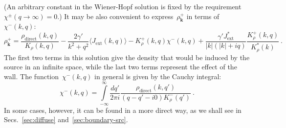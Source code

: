 \documentclass[preprint,aps,eqsecnum]{revtex4-1}
\newcommand{\fplus}[1]{{#1}^{+}}
\newcommand{\fminus}[1]{{#1}^{-}}
\newcommand{\fplusminus}[1]{{#1}^{\pm}}
\newcommand{\dct}[1]{{#1}_\mathrm{direct}}
\begin{document}
(An arbitrary constant in the Wiener-Hopf solution is fixed
by the requirement~$\fplusminus{\chi}(q\to \infty) = 0$.)
It may be also convenient to express~$\fplus{\rho}_{\bm k}$
in terms of~$\fminus{\chi}(k, q)$:
\begin{equation}
  \label{eq:solution-rho-plus}
  \fplus{\rho}_{\bm k} = \frac{\dct{\rho}(k, q)}{K_\rho(k, q)}
    - \frac{2 \gamma'}{k^2 + q^2} \langle J_\mathrm{ext}(k, q) \rangle
  - \fplus{K}_\rho(k, q) \fminus{\chi}(k, q)
  + \frac{\gamma' J_\mathrm{ext}^\ast}{|k|(|k| + iq)}
     \frac{\fplus{K}_\rho(k, q)}{K_\rho^\ast(k)}
  \  .
\end{equation}
The first two terms in this solution give the density that would be induced
by the source in an infinite space, while the last two terms represent
the effect of the wall.  The function~$\fminus{\chi}(k, q)$ in general is given
by the Cauchy integral:
\begin{equation}
  \label{eq:solution-chi}
  \fminus{\chi}(k, q) = \int\limits_{-\infty}^{\infty} \frac{dq'}{2\pi i}
  \frac{\dct{\rho}(k, q')}{(q - q' - i0) \fminus{K}_\rho(q')}
  \ .
\end{equation}
In some cases, however, it can be found in a more direct way, as we shall see
in Secs.~\ref{sec:diffuse} and~\ref{sec:boundary-src}.
\end{document}
